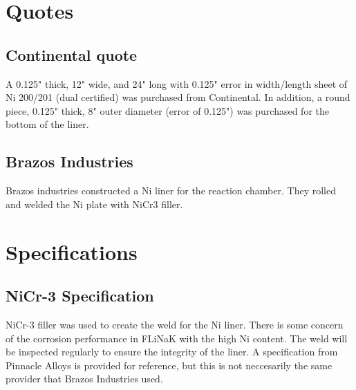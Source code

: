 %
%

\label{chap: appendix}

\section{Quotes}
\label{sec: quotes}

\subsection{Continental quote}
\label{sec:continental ni quote}
A 0.125" thick, 12" wide, and 24" long with 0.125" error in
width/length sheet of Ni 200/201 (dual
certified) was purchased from Continental. In addition, a round
piece, 0.125" thick, 8" outer diameter (error of 0.125")
was purchased for the bottom of the liner. \par

\pagebreak
\subsection{Brazos Industries}
\label{sec:brazos industries quote}
Brazos industries constructed a Ni liner for the reaction chamber.
They rolled and welded the Ni plate with NiCr3 filler.

\pagebreak

\section{Specifications}
\label{sec: specifications}

\subsection{NiCr-3 Specification}
\label{sec:nicr3}
NiCr-3 filler was used to create the weld for the Ni liner. There is
some concern of the corrosion performance in FLiNaK with the high Ni
content. The weld will be
inspected regularly to ensure the integrity of the liner. A specification
from Pinnacle Alloys is provided for reference, but this is not neccesarily
the same provider that Brazos Industries used.

\pagebreak

